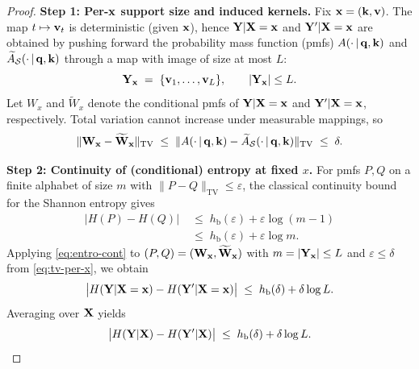 \begin{proof}
\label{proof:MI_bound}
\textbf{Step 1: Per-$\mathbf{x}$ support size and induced kernels.}
Fix $\mathbf{x}=(\mathbf{k},\mathbf{v})$. The map $t\mapsto \mathbf{v}_t$ is deterministic (given $\mathbf{x}$), hence
$\mathbf{Y}|\mathbf{X}=\mathbf{x}$ and $\mathbf{Y}'|\mathbf{X}=\mathbf{x}$ are obtained by pushing forward the probability mass function (pmfs) $A(\cdot\,|\,\mathbf{q},\mathbf{k})$ and $\widetilde A_{\mathcal S}(\cdot\,|\,\mathbf{q},\mathbf{k})$ through a map with image of size at most $L$:
\[
\mathcal {\mathbf{Y}}_{\mathbf{x}} \;=\;\{\mathbf{v}_1,\dots,\mathbf{v}_L\},\qquad |\mathcal {\mathbf{Y}}_{\mathbf{x}}|\le L.
\]
Let $W_x$ and $\widetilde W_x$ denote the conditional pmfs of $\mathbf{Y}|\mathbf{X}=\mathbf{x}$ and $\mathbf{Y}'|\mathbf{X}=\mathbf{x}$,
respectively. Total variation cannot increase under measurable mappings, so
\begin{equation}
\label{eq:tv-per-x}
\|\mathbf{W}_{\mathbf{x}}-\widetilde {\mathbf{W}}_{\mathbf{x}}\|_{\mathrm{TV}}
\;\le\;
\|A(\cdot\,|\,\mathbf{q},\mathbf{k})-\widetilde A_{\mathcal S}(\cdot\,|\,\mathbf{q},\mathbf{k})\|_{\mathrm{TV}}
\;\le\; \delta.
\end{equation}

\textbf{Step 2: Continuity of (conditional) entropy at fixed $x$.}
For pmfs $P,Q$ on a finite alphabet of size $m$ with
$\|P-Q\|_{\mathrm{TV}}\le \varepsilon$, the classical continuity bound for the
Shannon entropy gives
\begin{align}
\label{eq:entro-cont}
|H(P)-H(Q)|
&\;\le\;
h_{\mathrm b}(\varepsilon)+\varepsilon\log(m-1)  \nonumber \\
&\;\le\; 
h_{\mathrm b}(\varepsilon)+\varepsilon\log m .
\end{align}
Applying \eqref{eq:entro-cont} to $(P,Q)=(\mathbf{W}_{\mathbf{x}},\widetilde {\mathbf{W}}_{\mathbf{x}})$ with
$m=|\mathcal {\mathbf{Y}}_{\mathbf{x}}|\le L$ and $\varepsilon\le \delta$ from \eqref{eq:tv-per-x}, we obtain
\begin{equation}
\label{eq:cond-entropy-bound}
\big| H(\mathbf{Y}|\mathbf{X}=\mathbf{x})-H(\mathbf{Y}'|\mathbf{X}=\mathbf{x})\big|
\;\le\;
h_{\mathrm b}(\delta)+\delta\log L .
\end{equation}
Averaging over $\mathbf{X}$ yields
\begin{equation}
\label{eq:cond-entropy-global}
\big| H(\mathbf{Y}|\mathbf{X})-H(\mathbf{Y}'|\mathbf{X})\big|
\;\le\;
h_{\mathrm b}(\delta)+\delta\log L .
\end{equation}


\end{proof}
